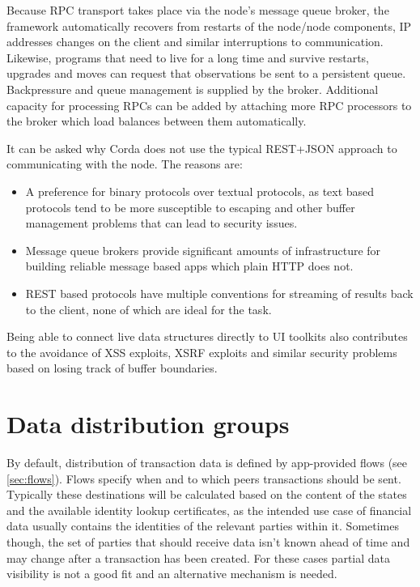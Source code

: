 \documentclass{article}
\begin{document}
Because RPC transport takes place via the node's message queue broker, the framework automatically recovers
from restarts of the node/node components, IP addresses changes on the client and similar interruptions to
communication. Likewise, programs that need to live for a long time and survive restarts, upgrades and moves
can request that observations be sent to a persistent queue. Backpressure and queue management is supplied by
the broker. Additional capacity for processing RPCs can be added by attaching more RPC processors to the broker
which load balances between them automatically.

It can be asked why Corda does not use the typical REST+JSON approach to communicating with the node. The reasons
are:

\begin{itemize}
\item A preference for binary protocols over textual protocols, as text based protocols tend to be more
susceptible to escaping and other buffer management problems that can lead to security issues.
\item Message queue brokers provide significant amounts of infrastructure for building reliable message based apps
which plain HTTP does not.
\item REST based protocols have multiple conventions for streaming of results back to the client, none of which
are ideal for the task.
\end{itemize}


Being able to connect live data structures directly to UI toolkits also contributes to the avoidance
of XSS exploits, XSRF exploits and similar security problems based on losing track of buffer boundaries.


\section{Data distribution groups}

By default, distribution of transaction data is defined by app-provided flows (see \cref{sec:flows}). Flows specify
when and to which peers transactions should be sent. Typically these destinations will be calculated based on the content
of the states and the available identity lookup certificates, as the intended use case of financial data usually
contains the identities of the relevant parties within it. Sometimes though, the set of parties that should receive
data isn't known ahead of time and may change after a transaction has been created. For these cases partial data
visibility is not a good fit and an alternative mechanism is needed.
\end{document}
